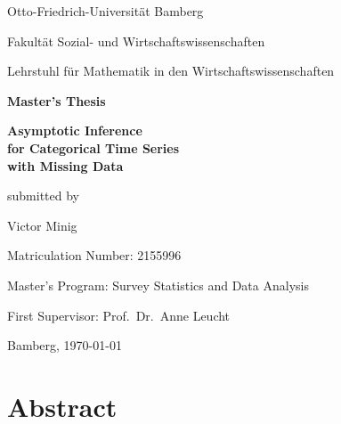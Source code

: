 ﻿\documentclass[12pt,a4paper]{scrreprt}
\theoremstyle{definition}
\begin{document}
\begin{titlepage}
    \centering
    {\large Otto-Friedrich-Universität Bamberg \par}
    \vspace{0.2cm}
    {\large Fakultät Sozial- und Wirtschaftswissenschaften \par}
    \vspace{0.2cm}
    {\large Lehrstuhl für Mathematik in den Wirtschaftswissenschaften \par}
    \vspace{2cm}

    {\Large\bfseries Master's Thesis \par}
    \vspace{1.5cm}

    {\huge\bfseries Asymptotic Inference\\
    for Categorical Time Series\\
    with Missing Data

    \par}
    \vspace{2cm}

    {\large submitted by \par}
    {\Large Victor Minig \par}
    \vspace{0.3cm}
    {\large Matriculation Number: 2155996 \par}
    \vspace{1cm}

    {\large Master's Program: Survey Statistics and Data Analysis \par}
    \vspace{1cm}
    {\large First Supervisor: Prof.\ Dr.\ Anne Leucht \par}
    \vspace{2cm}

    {\large Bamberg, \today \par}
\end{titlepage}

\tableofcontents
\clearpage
{}
\setcounter{page}{1}

\chapter*{Abstract}
\end{document}
